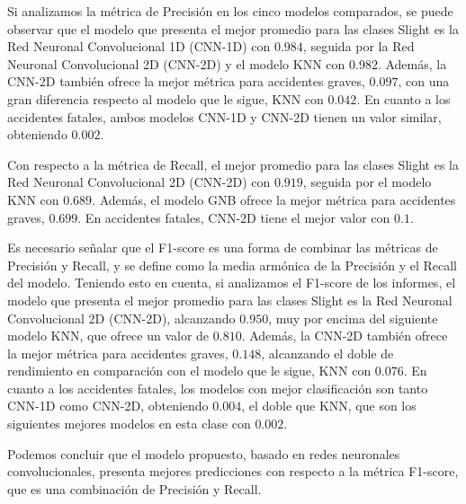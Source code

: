 \documentclass{uathesis-es}
\begin{document}
{Si analizamos la métrica de Precisión en los cinco modelos comparados, se puede observar que el modelo que presenta el mejor promedio para las clases Slight es la Red Neuronal Convolucional 1D (CNN-1D) con $0.984$, seguida por la Red Neuronal Convolucional 2D (CNN-2D) y el modelo KNN con $0.982$. Además, la CNN-2D también ofrece la mejor métrica para accidentes graves, $0.097$, con una gran diferencia respecto al modelo que le sigue, KNN con $0.042$. En cuanto a los accidentes fatales, ambos modelos CNN-1D y CNN-2D tienen un valor similar, obteniendo $0.002$.

Con respecto a la métrica de Recall, el mejor promedio para las clases Slight es la Red Neuronal Convolucional 2D (CNN-2D) con $0.919$, seguida por el modelo KNN con $0.689$. Además, el modelo GNB ofrece la mejor métrica para accidentes graves, $0.699$. En accidentes fatales, CNN-2D tiene el mejor valor con $0.1$.

Es necesario señalar que el F1-score es una forma de combinar las métricas de Precisión y Recall, y se define como la media armónica de la Precisión y el Recall del modelo. Teniendo esto en cuenta, si analizamos el F1-score de los informes, el modelo que presenta el mejor promedio para las clases Slight es la Red Neuronal Convolucional 2D (CNN-2D), alcanzando $0.950$, muy por encima del siguiente modelo KNN, que ofrece un valor de $0.810$. Además, la CNN-2D también ofrece la mejor métrica para accidentes graves, $0.148$, alcanzando el doble de rendimiento en comparación con el modelo que le sigue, KNN con $0.076$. En cuanto a los accidentes fatales, los modelos con mejor clasificación son tanto CNN-1D como CNN-2D, obteniendo $0.004$, el doble que KNN, que son los siguientes mejores modelos en esta clase con $0.002$.

Podemos concluir que el modelo propuesto, basado en redes neuronales convolucionales, presenta mejores predicciones con respecto a la métrica F1-score, que es una combinación de Precisión y Recall.

}
\end{document}
